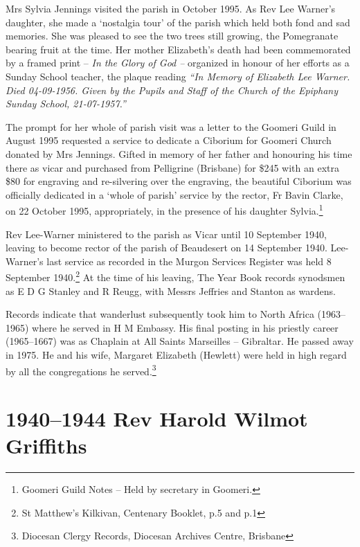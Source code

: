 Mrs Sylvia Jennings visited the parish in October 1995. As Rev Lee Warner's daughter, she made a `nostalgia tour' of the parish which held both fond and sad memories. She was pleased to see the two trees still growing, the Pomegranate bearing fruit at the time. Her mother Elizabeth's death had been commemorated by a framed print -- \emph{In the Glory of God --} organized in honour of her efforts as a Sunday School teacher, the plaque reading \emph{``In Memory of Elizabeth Lee Warner. Died 04-09-1956. Given by the Pupils and Staff of the Church of the Epiphany Sunday School, 21-07-1957.''}



The prompt for her whole of parish visit was a letter to the Goomeri Guild in August 1995 requested a service to dedicate a Ciborium for Goomeri Church donated by Mrs Jennings. Gifted in memory of her father and honouring his time there as vicar and purchased from Pelligrine (Brisbane) for \$245 with an extra \$80 for engraving and re-silvering over the engraving, the beautiful Ciborium was officially dedicated in a `whole of parish' service by the rector, Fr Bavin Clarke, on 22 October 1995, appropriately, in the presence of his daughter Sylvia.\footnote{Goomeri Guild Notes -- Held by secretary in Goomeri.}


Rev Lee-Warner ministered to the parish as Vicar until 10 September 1940, leaving to become rector of the parish of Beaudesert on 14 September 1940. Lee-Warner's last service as recorded in the Murgon Services Register was held 8 September 1940.\footnote{St Matthew's Kilkivan, Centenary Booklet, p.5 and p.1} At the time of his leaving, The Year Book records synodsmen as E D G Stanley and R Reugg, with Messrs Jeffries and Stanton as wardens.


Records indicate that wanderlust subsequently took him to North Africa (1963--1965) where he served in H M Embassy. His final posting in his priestly career (1965--1667) was as Chaplain at All Saints Marseilles -- Gibraltar. He passed away in 1975. He and his wife, Margaret Elizabeth (Hewlett) were held in high regard by all the congregations he served.\footnote{Diocesan Clergy Records, Diocesan Archives Centre, Brisbane}


\balance


\printendnotes[custom]
\setcounter{endnote}{0}
\chapter{1940--1944 Rev Harold Wilmot Griffiths}
\nobalance


